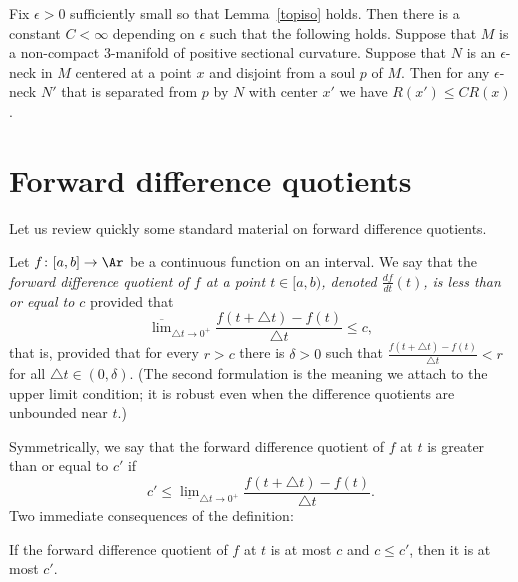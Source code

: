 \begin{corollary}
\label{cor:epsilon-neck-scale-bound}
\label{strnarrows}
Fix $\epsilon>0$ sufficiently small so that Lemma~\ref{topiso} holds. Then
there is a constant $C<\infty$ depending on $\epsilon$ such that the following
holds. Suppose that $M$ is a non-compact $3$-manifold of positive sectional
curvature. Suppose that $N$ is an $\epsilon$-neck in $M$ centered at a point
$x$ and disjoint from a soul $p$ of $M$. Then for any $\epsilon$-neck $N'$ that
is separated from $p$ by $N$ with center $x'$ we have $R(x')\le CR(x)$.
\end{corollary}

\section{Forward difference quotients}

Let us review quickly some standard material on forward difference quotients.

\begin{definition}
\label{def:forward-difference-quotient}
\leanok
{}
Let $f\colon [a,b]\to \Ar$ be a continuous function on an interval.
We say that the {\em forward difference quotient of $f$ at a point
$t\in [a,b)$, denoted $\frac{df}{dt}(t)$, is less than or equal to
$c$} provided that
$$\overline{\lim}_{\triangle t\rightarrow
0^+}\frac{f(t+\triangle t)-f(t)}{\triangle t}\le c,$$
that is, provided that for every $r>c$ there is $\delta>0$ such that
$\frac{f(t+\triangle t)-f(t)}{\triangle t}<r$ for all $\triangle t\in
(0,\delta)$. (The second formulation is the meaning we attach to the
upper limit condition; it is robust even when the difference quotients
are unbounded near $t$.)
\end{definition}

Symmetrically, we say that the forward difference quotient of $f$ at
$t$ is greater than or equal to $c'$ if $$c'\le
\underline{\lim}_{\triangle t\rightarrow 0^+}\frac{f(t+\triangle
t)-f(t)}{\triangle t}.$$ Two immediate consequences of the
definition:

\begin{lemma}
\label{lem:forward-difference-quotient-mono}
\leanok
{}
If the forward difference quotient of $f$ at $t$ is at most $c$ and
$c\le c'$, then it is at most $c'$.
\end{lemma}


